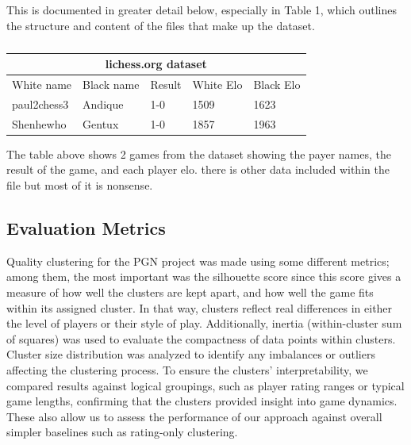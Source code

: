 \documentclass[conference]{IEEEtran}
\begin{document}
This is documented in greater detail below, especially in Table 1, which outlines the structure and content of the files that make up the dataset.

\begin{table}[htbp]
\vspace{.01cm}
\caption{}
\begin{center}
\begin{tabular}{|lllll|}
\hline
\multicolumn{5}{|c|}{lichess.org dataset}                                                                                                      \\ \hline
\multicolumn{1}{|l|}{White name}  & \multicolumn{1}{l|}{Black name} & \multicolumn{1}{l|}{Result} & \multicolumn{1}{l|}{White Elo} & Black Elo \\ \hline
\multicolumn{1}{|l|}{paul2chess3} & \multicolumn{1}{l|}{Andique}    & \multicolumn{1}{l|}{1-0}    & \multicolumn{1}{l|}{1509}      & 1623      \\ \hline
\multicolumn{1}{|l|}{Shenhewho}   & \multicolumn{1}{l|}{Gentux}     & \multicolumn{1}{l|}{1-0}    & \multicolumn{1}{l|}{1857}      & 1963      \\ \hline
\end{tabular}
\begin{minipage}{8cm}
    \vspace{0.1cm}
    \small The table above shows 2 games from the dataset showing the payer names, the result of the game, and each player elo. there is other data included within the file but most of it is nonsense.
\end{minipage}
\end{center}
\end{table}

\subsection{Evaluation Metrics}
Quality clustering for the PGN project was made using some different metrics; among them, the most important was the silhouette score since this score gives a measure of how well the clusters are kept apart, and how well the game fits within its assigned cluster. In that way, clusters reflect real differences in either the level of players or their style of play. Additionally, inertia (within-cluster sum of squares) was used to evaluate the compactness of data points within clusters. Cluster size distribution was analyzed to identify any imbalances or outliers affecting the clustering process. To ensure the clusters' interpretability, we compared results against logical groupings, such as player rating ranges or typical game lengths, confirming that the clusters provided insight into game dynamics. These also allow us to assess the performance of our approach against overall simpler baselines such as rating-only clustering.
\end{document}
